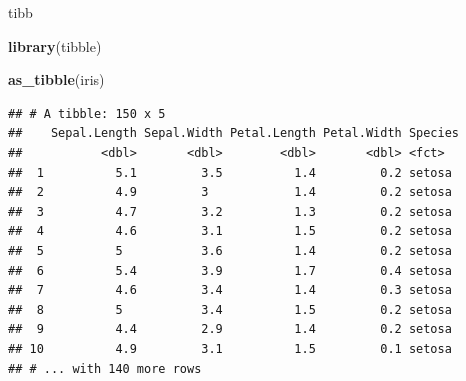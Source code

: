 \documentclass[ignorenonframetext,]{beamer}
\newenvironment{Shaded}{\begin{snugshade}}{\end{snugshade}}
\newcommand{\KeywordTok}[1]{\textcolor[rgb]{0.13,0.29,0.53}{\textbf{#1}}}
\newcommand{\NormalTok}[1]{#1}
\begin{document}
\begin{frame}[fragile]{tibb}
\protect\hypertarget{tibb-2}{}


\begin{Shaded}
\begin{Highlighting}[]
\KeywordTok{library}\NormalTok{(tibble)}

\KeywordTok{as_tibble}\NormalTok{(iris)}
\end{Highlighting}
\end{Shaded}

\begin{verbatim}
## # A tibble: 150 x 5
##    Sepal.Length Sepal.Width Petal.Length Petal.Width Species
##           <dbl>       <dbl>        <dbl>       <dbl> <fct>  
##  1          5.1         3.5          1.4         0.2 setosa 
##  2          4.9         3            1.4         0.2 setosa 
##  3          4.7         3.2          1.3         0.2 setosa 
##  4          4.6         3.1          1.5         0.2 setosa 
##  5          5           3.6          1.4         0.2 setosa 
##  6          5.4         3.9          1.7         0.4 setosa 
##  7          4.6         3.4          1.4         0.3 setosa 
##  8          5           3.4          1.5         0.2 setosa 
##  9          4.4         2.9          1.4         0.2 setosa 
## 10          4.9         3.1          1.5         0.1 setosa 
## # ... with 140 more rows
\end{verbatim}

\end{frame}
\end{document}
